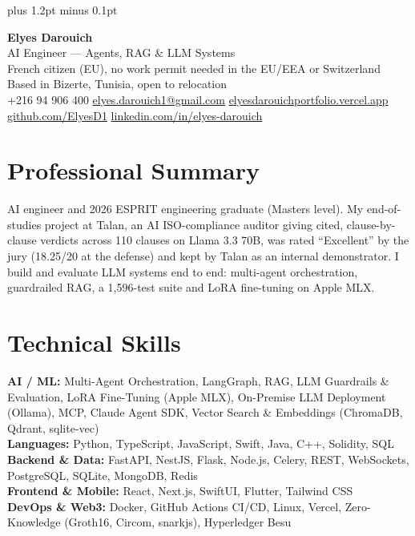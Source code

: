 \documentclass[a4paper,10pt]{article}
\newcommand{\readablespacing}{\spaceskip=3.3pt plus 1.2pt minus 0.1pt\relax}
\begin{document}
\raggedright
\readablespacing

\begin{center}
  {\spaceskip=0pt\relax\Huge\bfseries\color{accent} Elyes Darouich}\\[4pt]
  {\spaceskip=0pt\relax\large\color{muted} AI Engineer --- Agents, RAG \& LLM Systems}\\[6pt]
  {\small French citizen (EU), no work permit needed in the EU/EEA or Switzerland \quad\textbar\quad Based in Bizerte, Tunisia, open to relocation}\\[2pt]
  {\small +216 94 906 400 \quad\textbar\quad
  \href{mailto:elyes.darouich1@gmail.com}{elyes.darouich1@gmail.com} \quad\textbar\quad
  \href{https://elyesdarouichportfolio.vercel.app}{elyesdarouichportfolio.vercel.app}}\\[2pt]
  {\small \href{https://github.com/ElyesD1}{github.com/ElyesD1} \quad\textbar\quad
  \href{https://linkedin.com/in/elyes-darouich}{linkedin.com/in/elyes-darouich}}
\end{center}

\section{Professional Summary}
{\small AI engineer and 2026 ESPRIT engineering graduate (Master\textquotesingle s level). My end-of-studies project at Talan, an AI ISO-compliance auditor giving cited, clause-by-clause verdicts across 110 clauses on Llama 3.3 70B, was rated ``Excellent'' by the jury (18.25/20 at the defense) and kept by Talan as an internal demonstrator. I build and evaluate LLM systems end to end: multi-agent orchestration, guardrailed RAG, a 1,596-test suite and LoRA fine-tuning on Apple MLX.}

\section{Technical Skills}
{\small
{\bfseries AI / ML:} Multi-Agent Orchestration, LangGraph, RAG, LLM Guardrails \& Evaluation, LoRA Fine-Tuning (Apple MLX), On-Premise LLM Deployment (Ollama), MCP, Claude Agent SDK, Vector Search \& Embeddings (ChromaDB, Qdrant, sqlite-vec)\\[2pt]
{\bfseries Languages:} Python, TypeScript, JavaScript, Swift, Java, C++, Solidity, SQL\\[2pt]
{\bfseries Backend \& Data:} FastAPI, NestJS, Flask, Node.js, Celery, REST, WebSockets, PostgreSQL, SQLite, MongoDB, Redis\\[2pt]
{\bfseries Frontend \& Mobile:} React, Next.js, SwiftUI, Flutter, Tailwind CSS\\[2pt]
{\bfseries DevOps \& Web3:} Docker, GitHub Actions CI/CD, Linux, Vercel, Zero-Knowledge (Groth16, Circom, snarkjs), Hyperledger Besu}
\end{document}
